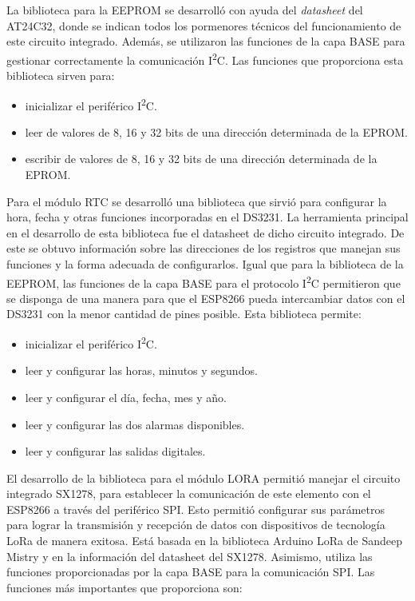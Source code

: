 La biblioteca para la EEPROM se desarrolló con ayuda del \textit{datasheet} \citep{WEBSITE:24} del AT24C32, donde se indican todos los pormenores técnicos del funcionamiento de este circuito integrado. Además, se utilizaron las funciones de la capa BASE para gestionar correctamente la comunicación I\textsuperscript{2}C. Las funciones que proporciona esta biblioteca sirven para:

\begin{itemize}
	\item inicializar el periférico I\textsuperscript{2}C.
	\item leer de valores de 8, 16 y 32 bits de una dirección determinada de la EPROM.
	\item escribir de valores de 8, 16 y 32 bits de una dirección determinada de la EPROM.
\end{itemize}

Para el módulo RTC se desarrolló una biblioteca que sirvió para configurar la hora, fecha y otras funciones incorporadas en el DS3231. La herramienta principal en el desarrollo de esta biblioteca fue el datasheet \citep{WEBSITE:25} de dicho circuito integrado. De este se obtuvo información sobre las direcciones de los registros que manejan sus funciones y la forma adecuada de configurarlos. Igual que para la biblioteca de la EEPROM, las funciones de la capa BASE para el protocolo I\textsuperscript{2}C permitieron que se disponga de una manera para que el ESP8266 pueda intercambiar datos con el DS3231 con la menor cantidad de pines posible. Esta biblioteca permite:

\begin{itemize}
	\item inicializar el periférico I\textsuperscript{2}C.
	\item leer y configurar las horas, minutos y segundos.
	\item leer y configurar el día, fecha, mes y año.
	\item leer y configurar las dos alarmas disponibles.
	\item leer y configurar las salidas digitales.
	
\end{itemize} 

El desarrollo de la biblioteca para el módulo LORA permitió manejar el circuito integrado SX1278, para establecer la comunicación de este elemento con el ESP8266 a través del periférico SPI. Esto permitió configurar sus parámetros para lograr la transmisión y recepción de datos con dispositivos de tecnología LoRa de manera exitosa. Está basada en la biblioteca Arduino LoRa de Sandeep Mistry \citep{WEBSITE:21} y en la información del datasheet \citep{WEBSITE:26} del SX1278. Asimismo, utiliza las funciones proporcionadas por la capa BASE para la comunicación SPI. Las funciones más importantes que proporciona son:

